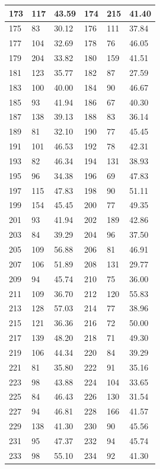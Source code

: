 \documentclass[10.9pt]{article} %
\begin{document}
{\begin{longtable}{|p{2cm}|p{2cm}|p{2cm}|p{2cm}|p{2cm}|p{2cm}|}
\hline
173 & 117& 43.59 & 174 & 215& 41.40\\
\hline
175 & 83& 30.12 & 176 & 111& 37.84\\
\hline
177 & 104& 32.69 & 178 & 76& 46.05\\
\hline
179 & 204& 33.82 & 180 & 159& 41.51\\
\hline
181 & 123& 35.77 & 182 & 87& 27.59\\
\hline
183 & 100& 40.00 & 184 & 90& 46.67\\
\hline
185 & 93& 41.94 & 186 & 67& 40.30\\
\hline
187 & 138& 39.13 & 188 & 83& 36.14\\
\hline
189 & 81& 32.10 & 190 & 77& 45.45\\
\hline
191 & 101& 46.53 & 192 & 78& 42.31\\
\hline
193 & 82& 46.34 & 194 & 131& 38.93\\
\hline
195 & 96& 34.38 & 196 & 69& 47.83\\
\hline
197 & 115& 47.83 & 198 & 90& 51.11\\
\hline
199 & 154& 45.45 & 200 & 77& 49.35\\
\hline
201 & 93& 41.94 & 202 & 189& 42.86\\
\hline
203 & 84& 39.29 & 204 & 96& 37.50\\
\hline
205 & 109& 56.88 & 206 & 81& 46.91\\
\hline
207 & 106& 51.89 & 208 & 131& 29.77\\
\hline
209 & 94& 45.74 & 210 & 75& 36.00\\
\hline
211 & 109& 36.70 & 212 & 120& 55.83\\
\hline
213 & 128& 57.03 & 214 & 77& 38.96\\
\hline
215 & 121& 36.36 & 216 & 72& 50.00\\
\hline
217 & 139& 48.20 & 218 & 71& 49.30\\
\hline
219 & 106& 44.34 & 220 & 84& 39.29\\
\hline
221 & 81& 35.80 & 222 & 91& 35.16\\
\hline
223 & 98& 43.88 & 224 & 104& 33.65\\
\hline
225 & 84& 46.43 & 226 & 130& 31.54\\
\hline
227 & 94& 46.81 & 228 & 166& 41.57\\
\hline
229 & 138& 41.30 & 230 & 90& 45.56\\
\hline
231 & 95& 47.37 & 232 & 94& 45.74\\
\hline
233 & 98& 55.10 & 234 & 92& 41.30\\

\end{longtable}}
\end{document}
